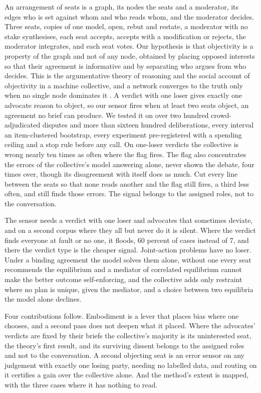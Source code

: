 An arrangement of seats is a graph, its nodes the seats and a moderator, its
edges who is set against whom and who reads whom, and the moderator decides.
Three seats, copies of one model, open, rebut and restate, a moderator with
no stake synthesises, each seat accepts, accepts with a modification or
rejects, the moderator integrates, and each seat votes. Our hypothesis is
that objectivity is a property of the graph and not of any node, obtained
by placing opposed interests so that their agreement is informative and by
separating who argues from who decides. This is the argumentative theory of
reasoning \citep{mercier2011argumentative} and the social account of
objectivity \citep{longino1990science} in a machine collective, and a
network converges to the truth only when no single node dominates it
\citep{golub2010naive}. A verdict with one loser gives exactly one advocate
reason to object, so our sensor fires when at least two seats object, an
agreement no brief can produce. We tested it on over two hundred
crowd-adjudicated disputes and more than sixteen hundred deliberations,
every interval an item-clustered bootstrap, every experiment pre-registered
with a spending ceiling and a stop rule before any call.
On one-loser verdicts the collective is wrong nearly ten times as often
where the flag fires.
The flag also concentrates the errors of the collective's model answering
alone, never shown the debate, four times over, though its disagreement
with itself does as much. Cut every line between the seats so that none
reads another and the flag still fires, a third less often, and still finds
those errors. The signal belongs to the assigned roles, not to the
conversation.

The sensor needs a verdict with one loser and advocates that sometimes
deviate, and on a second corpus where they all but never do it is silent.
Where the verdict finds everyone at fault or no one, it floods, 60 percent
of cases instead of 7, and there the verdict type is
the cheaper signal.
Joint-action problems have no loser. Under a binding agreement the model
solves them alone, without one every seat recommends the equilibrium and a
mediator of correlated equilibrium \citep{aumann1974subjectivity} cannot
make the better outcome self-enforcing, and the collective adds only
restraint where no plan is unique, given the mediator, and a choice between
two equilibria the model alone declines.

Four contributions follow. Embodiment is a lever that places bias where one
chooses, and a second pass does not deepen what it placed. Where the
advocates' verdicts are fixed by their briefs the collective's majority is
its uninterested seat, the theory's first result, and its surviving dissent
belongs to the assigned roles and not to the conversation. A second
objecting seat is an error sensor on any judgement with exactly one losing
party, needing no labelled data, and routing on it certifies a gain over the
collective alone. And the method's extent is mapped, with the three cases
where it has nothing to read.

